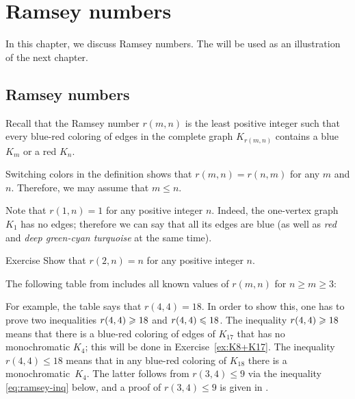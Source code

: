 \chapter{Ramsey numbers}

In this chapter, we discuss Ramsey numbers.
The will be used as an illustration of the next chapter.

\section{Ramsey numbers}

Recall that the Ramsey number $r(m,n)$ is the least positive integer such that every blue-red coloring of edges in the complete graph $K_{r(m, n)}$ contains a blue $K_m$ or a red $K_n$.

Switching colors in the definition shows that $r(m,n)=r(n,m)$ for any $m$ and $n$.
Therefore, we may assume that $m\le n$.

Note that $r(1,n)=1$ for any positive integer $n$.
Indeed, the one-vertex graph $K_1$ has no edges;
therefore we can say that all its edges are blue (as well as \textit{red} and \textit{deep green-cyan turquoise} at the same time).

\begin{thm}{Exercise}\label{ex:r(2,n)}
Show that $r(2,n)=n$ for any positive integer $n$.
\end{thm}

The following table from \cite{radziszowski} 
includes all known values of $r(m,n)$ for $n\ge m\ge 3$:

\begin{table}[ht!]\label{ramsey-table}
%
\end{table}

For example, the table says that $r(4,4)=18$.
In order to show this, one has to prove two inequalities $r(4,4)\geqslant 18$ and $r(4,4)\leqslant 18$.
The inequality $r(4,4)\geqslant 18$ means that there is a blue-red coloring of edges of $K_{17}$ that has no monochromatic $K_4$; this will be done in Exercise~\ref{ex:K8+K17}.
The inequality $r(4,4)\le 18$ means that in any blue-red coloring of $K_{18}$ there is a monochromatic~$K_4$.
The latter follows from $r(3,4)\le 9$ via the inequality \ref{eq:ramsey-inq} below, and
a proof of $r(3,4)\le 9$ is given in \cite[4.3]{hartsfield-ringel}.

